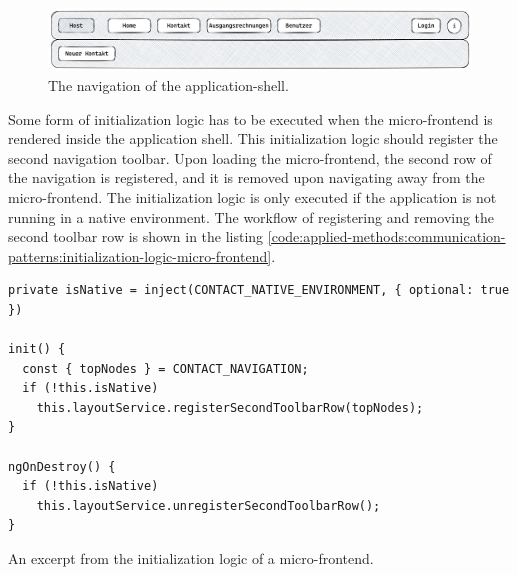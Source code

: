 \ifshowImages
  \begin{figure}[H]
  \centering
  \includegraphics[width=1\linewidth]{images/applied-methods/communication-patterns/host-contact-header.png}
  \caption{The navigation of the application-shell.}\label{fig:applied-methods:communication-patterns:application-shell-header}
  \end{figure}
\fi

\noindent Some form of initialization logic has to be executed when the micro-frontend is rendered inside the application shell. This initialization logic should register the second navigation toolbar. Upon loading the micro-frontend, the second row of the navigation is registered, and it is removed upon navigating away from the micro-frontend. The initialization logic is only executed if the application is not running in a native environment. The workflow of registering and removing the second toolbar row is shown in the listing \ref{code:applied-methods:communication-patterns:initialization-logic-micro-frontend}.

\ifshowListings
  \begin{listing}[H]
  \begin{verbatim}
private isNative = inject(CONTACT_NATIVE_ENVIRONMENT, { optional: true })

init() {
  const { topNodes } = CONTACT_NAVIGATION;
  if (!this.isNative)
    this.layoutService.registerSecondToolbarRow(topNodes);
}

ngOnDestroy() {
  if (!this.isNative)
    this.layoutService.unregisterSecondToolbarRow();
}
  \end{verbatim}
  \caption{An excerpt from the initialization logic of a micro-frontend.}\label{code:applied-methods:communication-patterns:initialization-logic-micro-frontend}
  \end{listing}
\fi

